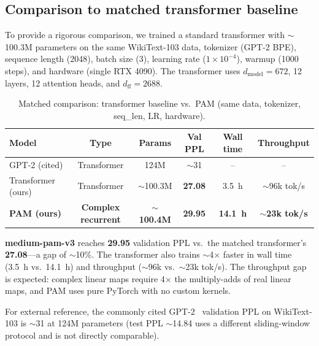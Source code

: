 \documentclass[11pt]{article}
\begin{document}
\subsection{Comparison to matched transformer baseline}
\label{sec:transformer-comparison}
To provide a rigorous comparison, we trained a standard transformer with $\sim$100.3M parameters on the same WikiText-103 data, tokenizer (GPT-2 BPE), sequence length (2048), batch size (3), learning rate ($1 \times 10^{-4}$), warmup (1000 steps), and hardware (single RTX 4090). The transformer uses $d_{\text{model}} = 672$, 12 layers, 12 attention heads, and $d_{\text{ff}} = 2688$.

\begin{table}[t]
  \centering
  \caption{Matched comparison: transformer baseline vs.\ PAM (same data, tokenizer, seq\_len, LR, hardware).}
  \label{tab:gpt2}
  \begin{tabular}{@{}lccccc@{}}
    \toprule
    Model & Type & Params & Val PPL & Wall time & Throughput \\
    \midrule
    GPT-2 (cited) & Transformer & 124M & $\sim$31 & -- & -- \\
    Transformer (ours) & Transformer & $\sim$100.3M & \textbf{27.08} & 3.5~h & $\sim$96k tok/s \\
    \textbf{PAM (ours)} & \textbf{Complex recurrent} & \textbf{$\sim$100.4M} & \textbf{29.95} & \textbf{14.1~h} & \textbf{$\sim$23k tok/s} \\
    \bottomrule
  \end{tabular}
\end{table}

\textbf{medium-pam-v3} reaches \textbf{29.95} validation PPL vs.\ the matched transformer's \textbf{27.08}---a gap of $\sim$10\%. The transformer also trains $\sim$4$\times$ faster in wall time (3.5~h vs.\ 14.1~h) and throughput ($\sim$96k vs.\ $\sim$23k tok/s). The throughput gap is expected: complex linear maps require 4$\times$ the multiply-adds of real linear maps, and PAM uses pure PyTorch with no custom kernels.

For external reference, the commonly cited GPT-2~\cite{radford2019language} validation PPL on WikiText-103 is $\sim$31 at 124M parameters (test PPL $\sim$14.84 uses a different sliding-window protocol and is not directly comparable).
\end{document}
